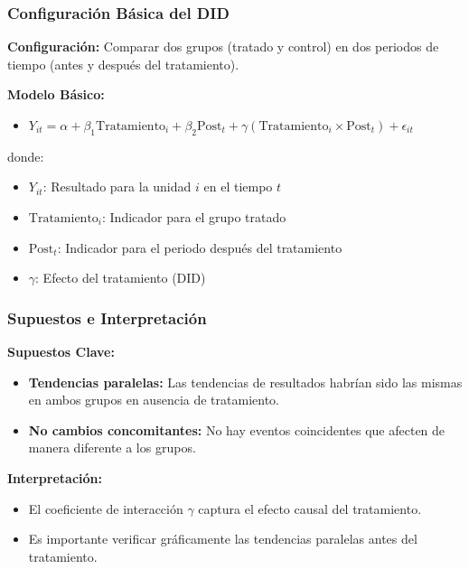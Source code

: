 \documentclass[notes,10pt,aspectratio=169]{beamer}
\begin{document}
\begin{frame}
  \frametitle{Configuración Básica del DID}

  \textbf{Configuración:} Comparar dos grupos (tratado y control) en dos periodos de tiempo (antes y después del tratamiento).

  \vspace{1em}
  \textbf{Modelo Básico:}
  \begin{itemize}
    \item $Y_{it} = \alpha + \beta_1 \text{Tratamiento}_i + \beta_2 \text{Post}_t + \gamma (\text{Tratamiento}_i \times \text{Post}_t) + \epsilon_{it}$
  \end{itemize}
  donde:
  \begin{itemize}
    \item $Y_{it}$: Resultado para la unidad $i$ en el tiempo $t$
    \item $\text{Tratamiento}_i$: Indicador para el grupo tratado
    \item $\text{Post}_t$: Indicador para el periodo después del tratamiento
    \item $\gamma$: Efecto del tratamiento (DID)
  \end{itemize}
\end{frame}

\begin{frame}
  \frametitle{Supuestos e Interpretación}

  \textbf{Supuestos Clave:}
  \begin{itemize}
    \item \textbf{Tendencias paralelas:} Las tendencias de resultados habrían sido las mismas en ambos grupos en ausencia de tratamiento.
    \item \textbf{No cambios concomitantes:} No hay eventos coincidentes que afecten de manera diferente a los grupos.
  \end{itemize}

  \vspace{1em}
  \textbf{Interpretación:}
  \begin{itemize}
    \item El coeficiente de interacción $\gamma$ captura el efecto causal del tratamiento.
    \item Es importante verificar gráficamente las tendencias paralelas antes del tratamiento.
  \end{itemize}
\end{frame}
\end{document}
